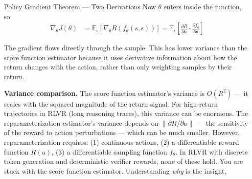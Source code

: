 \begin{thinkfirst}{Policy Gradient Theorem --- Two Derivations}
Now $\theta$ enters inside the function, so:
\begin{align*}
  \nabla_\theta J(\theta) &= \mathbb{E}_{\epsilon}\!\left[\nabla_\theta R(f_\theta(s, \epsilon))\right] = \mathbb{E}_{\epsilon}\!\left[\frac{\partial R}{\partial a} \cdot \frac{\partial f_\theta}{\partial \theta}\right]
\end{align*}

The gradient flows directly through the sample. This has lower variance than the score function estimator because it uses derivative information about how the return changes with the action, rather than only weighting samples by their return.

\textbf{Variance comparison.} The score function estimator's variance is $O(R^2)$ --- it scales with the squared magnitude of the return signal. For high-return trajectories in RLVR (long reasoning traces), this variance can be enormous. The reparameterization estimator's variance depends on $\|\partial R / \partial a\|$ --- the sensitivity of the reward to action perturbations --- which can be much smaller. However, reparameterization requires: (1) continuous actions, (2) a differentiable reward function $R(a)$, (3) a differentiable sampling function $f_\theta$. In RLVR with discrete token generation and deterministic verifier rewards, none of these hold. You are stuck with the score function estimator. Understanding \textit{why} is the insight.
\end{thinkfirst}

